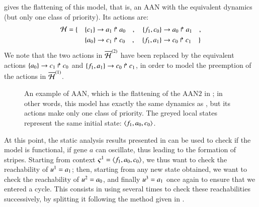  gives the flattening of this model,
that is, an AAN with the equivalent dynamics
(but only one class of priority).
Its actions are:
\begin{align*}
  \mathcal{H} = \{ \quad
    & \{c_1\}\rightarrow a_1\Rsh a_0 \quad , \quad
    \{f_1, c_0\}\rightarrow a_0\Rsh a_1 \quad , \\
    & \{a_0\}\rightarrow c_1\Rsh c_0 \quad , \quad
    \{f_1, a_1\}\rightarrow c_0\Rsh c_1
  \quad \}
\end{align*}
We note that the two actions in $\overline{\mathcal{H}}^{(2)}$ have been replaced by
the equivalent actions
$\{a_0\}\rightarrow c_1\Rsh c_0$ and $\{f_1, a_1\}\rightarrow c_0\Rsh c_1$,
in order to model the preemption of the actions in $\overline{\mathcal{H}}^{(1)}$.

\begin{figure}[p]
  \centering
  \caption{
  \label{fig:metazoan-ph}
    An example of AAN, which is the flattening of the AAN$2$ in ;
    in other words, this model has exactly the same dynamics as
    , but its actions make only one class of priority.
    The greyed local states represent the same initial state:
    $\mbox{$\langle f_1, a_0, c_0 \rangle$}$.
  }
\end{figure}

\medskip

At this point, the static analysis results presented in
 can be used to check if the model is functional,
\ie if gene $a$ can oscillate, thus leading to the formation of stripes.
Starting from context $\varsigma^1 = \mbox{$\langle f_1, a_0, c_0 \rangle$}$,
we thus want to check the reachability of $u^1 = a_1$;
then, starting from any new state obtained,
we want to check the reachability of $u^2 = a_0$,
and finally $u^3 = a_1$ once again to ensure that we entered a cycle.
This consists in using  several times
to check these reachabilities successively,
by splitting it following the method given in .

